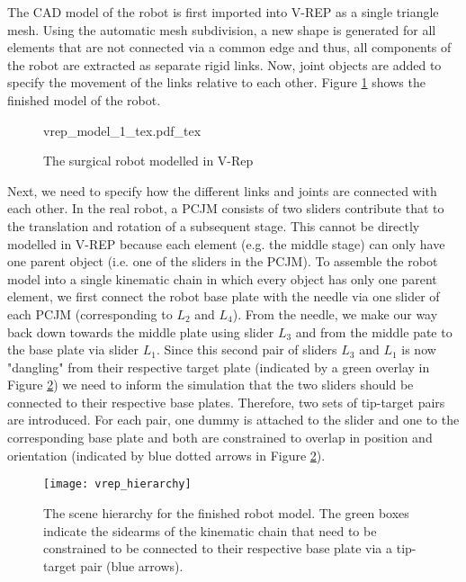 The CAD model of the robot is first imported into V-REP as a single triangle mesh. Using the automatic mesh subdivision, a new shape is generated for all elements that are not connected via a common edge and thus, all components of the robot are extracted as separate rigid links. Now, joint objects are added to specify the movement of the links relative to each other. Figure \ref{vrep_model} shows the finished model of the robot.  

\begin{figure}[b!]
	\centering
	{vrep_model_1_tex.pdf_tex}
	\caption{The surgical robot modelled in V-Rep}
	\label{vrep_model}
\end{figure}

Next, we need to specify how the different links and joints are connected with each other. In the real robot, a PCJM consists of two sliders contribute that to the translation and rotation of a subsequent stage. This cannot be directly modelled in V-REP because each element (e.g. the middle stage) can only have one parent object (i.e. one of the sliders in the PCJM). To assemble the robot model into a single kinematic chain in which every object has only one parent element, we first connect the robot base plate with the needle via one slider of each PCJM (corresponding to $L_2$ and $L_4$). From the needle, we make our way back down towards the middle plate using slider $L_3$ and from the middle pate to the base plate via slider $L_1$. Since this second pair of sliders $L_3$ and $L_1$ is now "dangling" from their respective target plate (indicated by a green overlay in Figure \ref{vrep_hierarchy}) we need to inform the simulation that the two sliders should be connected to their respective base plates. Therefore, two sets of tip-target pairs are introduced. For each pair, one dummy is attached to the slider and one to the corresponding base plate and both are constrained to overlap in position and orientation (indicated by blue dotted arrows in Figure \ref{vrep_hierarchy}).     

\begin{figure}[t!]
	\centering
	\texttt{[image: vrep\_hierarchy]}
	\caption{The scene hierarchy for the finished robot model. The green boxes indicate the sidearms of the kinematic chain that need to be constrained to be connected to their respective base plate via a tip-target pair (blue arrows).}
	\label{vrep_hierarchy}
\end{figure}

